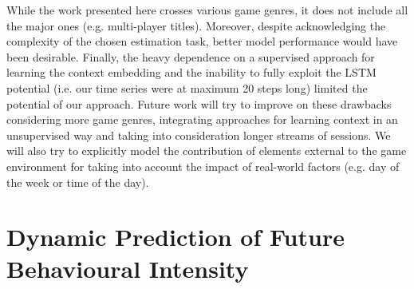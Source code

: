 While the work presented here crosses various game genres, it does not include all the major ones (e.g. multi-player titles). Moreover, despite acknowledging the complexity of the chosen estimation task, better model performance would have been desirable. Finally, the heavy dependence on a supervised approach for learning the context embedding and the inability to fully exploit the LSTM potential (i.e. our time series were at maximum 20 steps long) limited the potential of our approach. Future work will try to improve on these drawbacks considering more game genres, integrating approaches for learning context in an unsupervised way and taking into consideration longer streams of sessions. We will also try to explicitly model the contribution of elements external to the game environment for taking into account the impact of real-world factors (e.g. day of the week or time of the day).

\section{Dynamic Prediction of Future Behavioural Intensity}
\label{model_architecture_1}
\lorem

